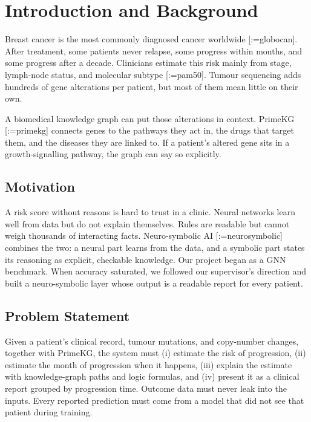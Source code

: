 \documentclass{mnnit}
\makeatletter
\newcommand{\rc}[1]{[\def\rc@sep{}\@for\rc@key:=#1\do{\rc@sep\ref{ref:\rc@key}\def\rc@sep{, }}]}
\makeatother
\begin{document}
\afterpreface

\chapter{Introduction and Background}

Breast cancer is the most commonly diagnosed cancer worldwide \rc{globocan}. After treatment, some patients never
relapse, some progress within months, and some progress after a decade. Clinicians estimate this risk mainly from
stage, lymph-node status, and molecular subtype \rc{pam50}. Tumour sequencing adds hundreds of gene alterations per
patient, but most of them mean little on their own.

A biomedical knowledge graph can put those alterations in context. PrimeKG \rc{primekg} connects genes to the pathways
they act in, the drugs that target them, and the diseases they are linked to. If a patient's altered gene sits in a
growth-signalling pathway, the graph can say so explicitly.

\section{Motivation}
A risk score without reasons is hard to trust in a clinic. Neural networks learn well from data but do not explain
themselves. Rules are readable but cannot weigh thousands of interacting facts. Neuro-symbolic AI
\rc{neurosymbolic} combines the two: a neural part learns from the data, and a symbolic part states its reasoning as
explicit, checkable knowledge. Our project began as a GNN benchmark. When accuracy saturated, we followed our
supervisor's direction and built a neuro-symbolic layer whose output is a readable report for every patient.

\section{Problem Statement}
Given a patient's clinical record, tumour mutations, and copy-number changes, together with PrimeKG, the system must
(i) estimate the risk of progression, (ii) estimate the month of progression when it happens, (iii) explain the
estimate with knowledge-graph paths and logic formulas, and (iv) present it as a clinical report grouped by
progression time. Outcome data must never leak into the inputs. Every reported prediction must come from a model that
did not see that patient during training.
\end{document}
